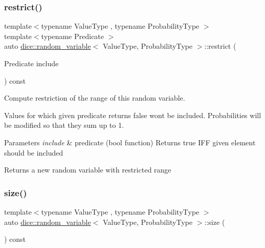 \subsubsection{\texorpdfstring{restrict()}{restrict()}}
{\footnotesize\ttfamily template$<$typename Value\+Type , typename Probability\+Type $>$ \\
template$<$typename Predicate $>$ \\
auto \mbox{\hyperlink{classdice_1_1random__variable}{dice\+::random\+\_\+variable}}$<$ Value\+Type, Probability\+Type $>$\+::restrict (\begin{DoxyParamCaption}\item[{Predicate}]{include }\end{DoxyParamCaption}) const\hspace{0.3cm}{\ttfamily [inline]}}



Compute restriction of the range of this random variable. 

Values for which given predicate returns false won\textquotesingle{}t be included. Probabilities will be modified so that they sum up to 1.


\begin{DoxyParams}{Parameters}
{\em include} & predicate (bool function) Returns true I\+FF given element should be included\\
\hline
\end{DoxyParams}
\begin{DoxyReturn}{Returns}
a new random variable with restricted range 
\end{DoxyReturn}
\mbox{\label{classdice_1_1random__variable_a60637ec353c3cd3046017d54824f1fd8}} 
\subsubsection{\texorpdfstring{size()}{size()}}
{\footnotesize\ttfamily template$<$typename Value\+Type , typename Probability\+Type $>$ \\
auto \mbox{\hyperlink{classdice_1_1random__variable}{dice\+::random\+\_\+variable}}$<$ Value\+Type, Probability\+Type $>$\+::size (\begin{DoxyParamCaption}{ }\end{DoxyParamCaption}) const\hspace{0.3cm}{\ttfamily [inline]}}




